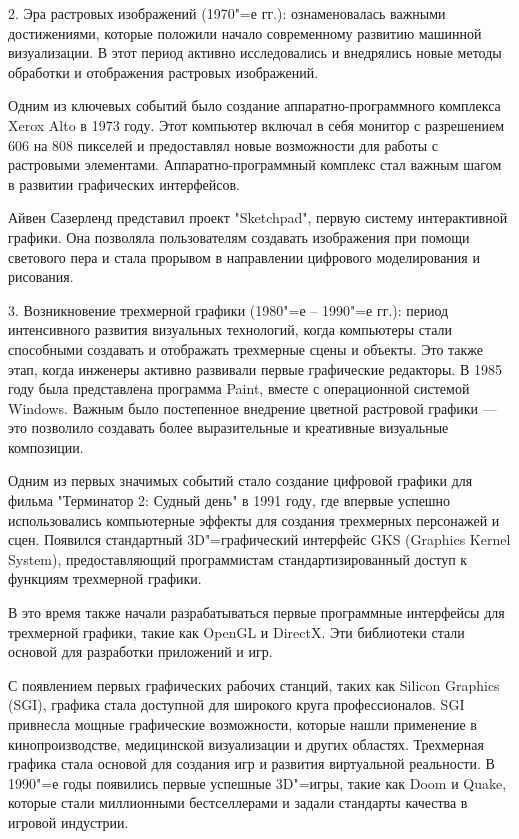 2. Эра растровых изображений (1970"=е гг.): ознаменовалась важными достижениями, которые положили начало современному развитию машинной визуализации. В этот период активно исследовались и внедрялись новые методы обработки и отображения растровых изображений.

Одним из ключевых событий было создание аппаратно-программного комплекса Xerox Alto в 1973 году. Этот компьютер включал в себя монитор с разрешением 606 на 808 пикселей и предоставлял новые возможности для работы с растровыми элементами. Аппаратно-программный комплекс стал важным шагом в развитии графических интерфейсов.

Айвен Сазерленд представил проект "Sketchpad", первую систему интерактивной графики. Она позволяла пользователям создавать изображения при помощи светового пера и стала прорывом в направлении цифрового моделирования и рисования.

3. Возникновение трехмерной графики (1980"=е -- 1990"=е гг.): период интенсивного развития визуальных технологий, когда компьютеры стали способными создавать и отображать трехмерные сцены и объекты. Это также этап, когда инженеры активно развивали первые графические редакторы. В 1985 году была представлена программа Paint, вместе с операционной системой Windows. Важным было постепенное внедрение цветной растровой графики — это позволило создавать более выразительные и креативные визуальные композиции.

Одним из первых значимых событий стало создание цифровой графики для фильма "Терминатор 2: Судный день" в 1991 году, где впервые успешно использовались компьютерные эффекты для создания трехмерных персонажей и сцен.
Появился стандартный 3D"=графический интерфейс GKS (Graphics Kernel System), предоставляющий программистам стандартизированный доступ к функциям трехмерной графики.

В это время также начали разрабатываться первые программные интерфейсы для трехмерной графики, такие как OpenGL и DirectX. Эти библиотеки стали основой для разработки приложений и игр.

С появлением первых графических рабочих станций, таких как Silicon Graphics (SGI), графика стала доступной для широкого круга профессионалов. SGI привнесла мощные графические возможности, которые нашли применение в кинопроизводстве, медицинской визуализации и других областях.
Трехмерная графика стала основой для создания игр и развития виртуальной реальности. В 1990"=е годы появились первые успешные 3D"=игры, такие как Doom и Quake, которые стали миллионными бестселлерами и задали стандарты качества в игровой индустрии.

